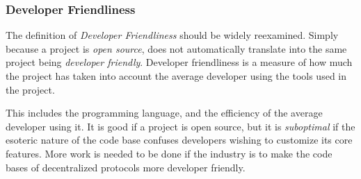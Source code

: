 \documentclass[10pt, titlepage, twocolumn]{report}
\begin{document}
\subsubsection{Developer Friendliness}
\hspace*{15pt}
The definition of \textit{Developer Friendliness} should be widely reexamined. Simply because a project is \textit{open source}, does not automatically translate into the same project being \textit{developer friendly}. Developer friendliness is a measure of how much the project has taken into account the average developer using the tools used in the project. 

\hspace*{15pt}
This includes the programming language, and the efficiency of the average developer using it. It is good if a project is open source, but it is \textit{suboptimal} if the esoteric nature of the code base confuses developers wishing to customize its core features. More work is needed to be done if the industry is to make the code bases of decentralized protocols more developer friendly. 
\end{document}
